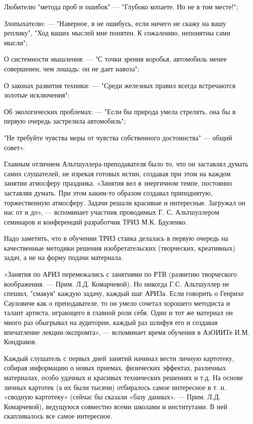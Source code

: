 Любителю  "метода проб  и  ошибок" —  "Глубоко копаете.  Но  не в  том
месте!";

Злопыхателю: — "Наверное,  я не ошибусь, если ничего не  скажу на вашу
реплику", "Ход ваших  мыслей мне понятен. К  сожалению, непонятны сами
мысли";

О системности  мышления: — "С  точки зрения воробья,  автомобиль менее
совершенен, чем лошадь: он не дает навоза";

О  законах   развития  техники:   —  "Среди  железных   правил  всегда
встречаются золотые исключения";

Об экологических проблемах: — "Если  бы природа умела стрелять, она бы
в первую очередь застрелила автомобиль";

"Не требуйте чувства меры от чувства собственного достоинства" — общий
совет».


Главным отличием  Альтшуллера-преподавателя было то, что  он заставлял
думать самих слушателей,  не изрекая готовых истин,  создавая при этом
на  каждом  занятии атмосферу  праздника.  «Занятия  вел в  энергичном
темпе, постоянно заставляя думать.  При этом каким-то образом создавал
приподнятую,  торжественную   атмосферу.  Задачи  решали   красивые  и
интересные. Загружал он нас от и до», — вспоминает участник проводимых
Г.  С.  Альтшуллером семинаров  и  конференций  разработчик ТРИЗ  М.К.
Бдуленко.

Надо  заметить,  что   в  обучении  ТРИЗ  ставка   делалась  в  первую
очередь на качественные методики решения изобретательских (творческих,
креативных) задач, а не на форму подачи материала.

«Занятия по АРИЗ перемежались с занятиями по РТВ (развитию творческого
воображения. — Прим.  Л.Д. Комарчевой). Но никогда  Г.С. Альтшуллер не
спешил,  "смакуя" каждую  задачу, каждый  шаг АРИЗа.  Если говорить  о
Генрихе Сауловиче  как о преподавателе,  то он умело  сочетал хорошего
методиста и талант артиста, играющего в  главной роли себя. Один и тот
же материал он много раз обыгрывал на аудитории, каждый раз шлифуя его
и создавая впечатление лекции-экспромта»,  — вспоминает время обучения
в АзОИИТе И.М. Кондраков.

Каждый слушатель с первых дней занятий начинал вести личную картотеку,
собирая  информацию о  новых приемах,  физических эффектах,  различных
материалах, особо  удачных и красивых  технических решениях и  т.д. На
основе личных картотек (а их  были тысячи) отбиралось самое интересное
в т. н. «сводную картотеку» (сейчас  бы сказали «базу данных». — Прим.
Л.Д. Комарчевой),  ведущуюся совместно всеми школами  и институтами. В
ней скапливалось все самое интересное.


